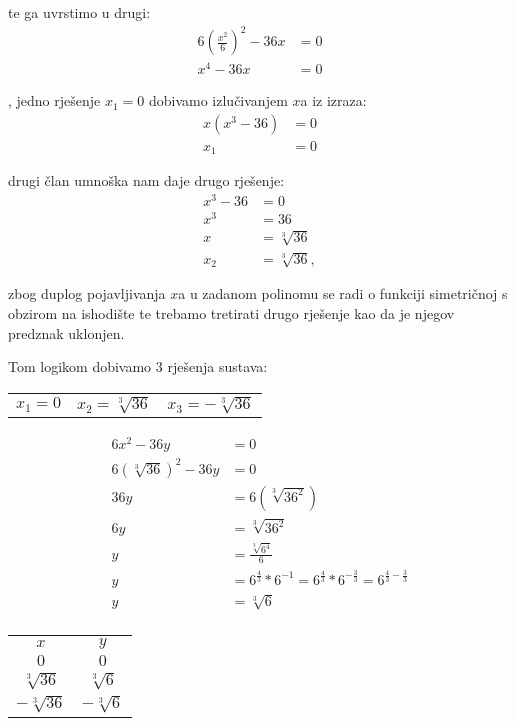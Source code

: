 te ga uvrstimo u drugi:
\begin{align*}
    6(\frac{x^2}{6})^2 - 36x & = 0 \\
    x^4 - 36x & = 0
\end{align*}

, jedno rješenje $x_1 = 0$ dobivamo izlučivanjem $x$a iz izraza:
\begin{align*}
    x(x^3 - 36) &= 0 \\
    x_1 &= 0
\end{align*}

drugi član umnoška nam daje drugo rješenje:
\begin{align*}
    x^3 - 36 &= 0 \\
    x^3 &= 36 \\
    x &= \sqrt[3]{36} \\
    x_2 &= \sqrt[3]{36},
\end{align*}

zbog duplog pojavljivanja $x$a u zadanom polinomu se radi o funkciji simetričnoj s obzirom na ishodište te trebamo tretirati drugo rješenje kao da je njegov predznak uklonjen.

Tom logikom dobivamo 3 rješenja sustava:
\begin{center}
\begin{tabular}{c c c}
    $x_1 = 0$ & $x_2 = \sqrt[3]{36}$ & $x_3 = -\sqrt[3]{36}$\\
\end{tabular}
\end{center}

\begin{align*}
    6x^2 - 36y &= 0\\
    6(\sqrt[3]{36})^2 - 36y &= 0\\
    36y &= 6(\sqrt[3]{36^2})\\
    6y &= \sqrt[3]{36^2} \\
    y &= \frac{\sqrt[3]{6^4}}{6} \\
    y &= 6^{\frac{4}{3}} * 6^{-1} = 6^{\frac{4}{3}} * 6^{-\frac{3}{3}} = 6^{\frac{4}{3} - \frac{3}{3}} \\
    y &= \sqrt[3]6 \\
\end{align*}

\begin{center}
\begin{tabular}{c c}
    $x$ & $y$ \\
    $0$ & $0$ \\
    $\sqrt[3]{36}$ & $\sqrt[3]6$ \\
    $-\sqrt[3]{36}$ & $-\sqrt[3]6$ \\
\end{tabular}
\end{center}

